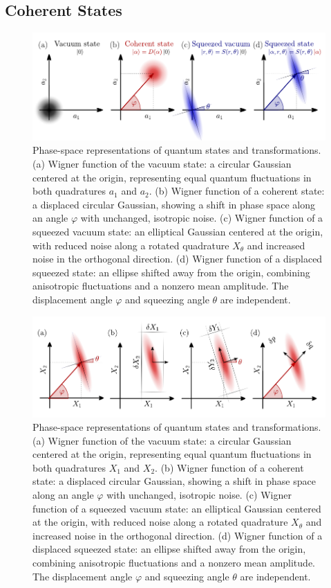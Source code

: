 \subsection*{Coherent States}


\begin{figure}
\centering
\includegraphics[width=\textwidth]{./chap2/fig/quantumstates (2).pdf}
\caption{Phase-space representations of quantum states and transformations.
(a) Wigner function of the vacuum state: a circular Gaussian centered at the origin, representing equal quantum fluctuations in both quadratures $a_1$ and $a_2$.
(b) Wigner function of a coherent state: a displaced circular Gaussian, showing a shift in phase space along an angle $\varphi$ with unchanged, isotropic noise.
(c) Wigner function of a squeezed vacuum state: an elliptical Gaussian centered at the origin, with reduced noise along a rotated quadrature $X_\theta$ and increased noise in the orthogonal direction.
(d) Wigner function of a displaced squeezed state: an ellipse shifted away from the origin, combining anisotropic fluctuations and a nonzero mean amplitude. The displacement angle $\varphi$ and squeezing angle $\theta$ are independent.} 
\end{figure}

\begin{figure}
\centering
\includegraphics[width=\textwidth]{./chap2/fig/quadratures_phasespace.pdf}
\caption{Phase-space representations of quantum states and transformations.
(a) Wigner function of the vacuum state: a circular Gaussian centered at the origin, representing equal quantum fluctuations in both quadratures $X_1$ and $X_2$.
(b) Wigner function of a coherent state: a displaced circular Gaussian, showing a shift in phase space along an angle $\varphi$ with unchanged, isotropic noise.
(c) Wigner function of a squeezed vacuum state: an elliptical Gaussian centered at the origin, with reduced noise along a rotated quadrature $X_\theta$ and increased noise in the orthogonal direction.
(d) Wigner function of a displaced squeezed state: an ellipse shifted away from the origin, combining anisotropic fluctuations and a nonzero mean amplitude. The displacement angle $\varphi$ and squeezing angle $\theta$ are independent.} 
\end{figure}


